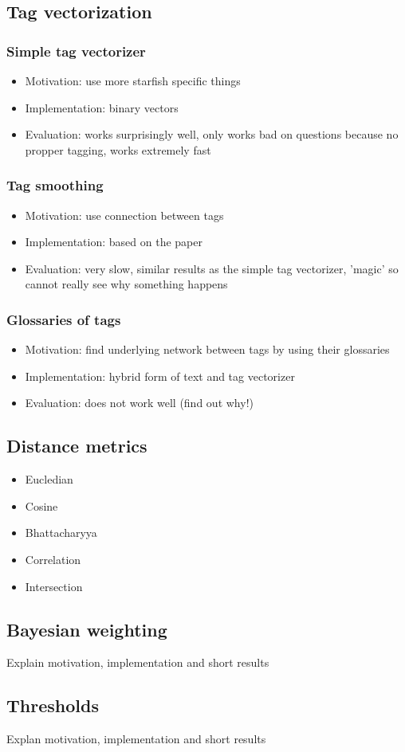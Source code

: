 \subsection{Tag vectorization}
\subsubsection{Simple tag vectorizer}
\begin{itemize}
\item Motivation: use more starfish specific things
\item Implementation: binary vectors
\item Evaluation: works surprisingly well, only works bad on questions because no propper tagging, works extremely fast
\end{itemize}

\subsubsection{Tag smoothing}
\begin{itemize}
\item Motivation: use connection between tags
\item Implementation: based on the paper
\item Evaluation: very slow, similar results as the simple tag vectorizer, 'magic' so cannot really see why something happens
\end{itemize}

\subsubsection{Glossaries of tags}
\begin{itemize}
\item Motivation: find underlying network between tags by using their glossaries
\item Implementation: hybrid form of text and tag vectorizer
\item Evaluation: does not work well (find out why!) 
\end{itemize}

\subsection{Distance metrics}
\begin{itemize}
\item Eucledian
\item Cosine
\item Bhattacharyya
\item Correlation
\item Intersection
\end{itemize}

\subsection{Bayesian weighting}
Explain motivation, implementation and short results

\subsection{Thresholds}
Explan motivation, implementation and short results